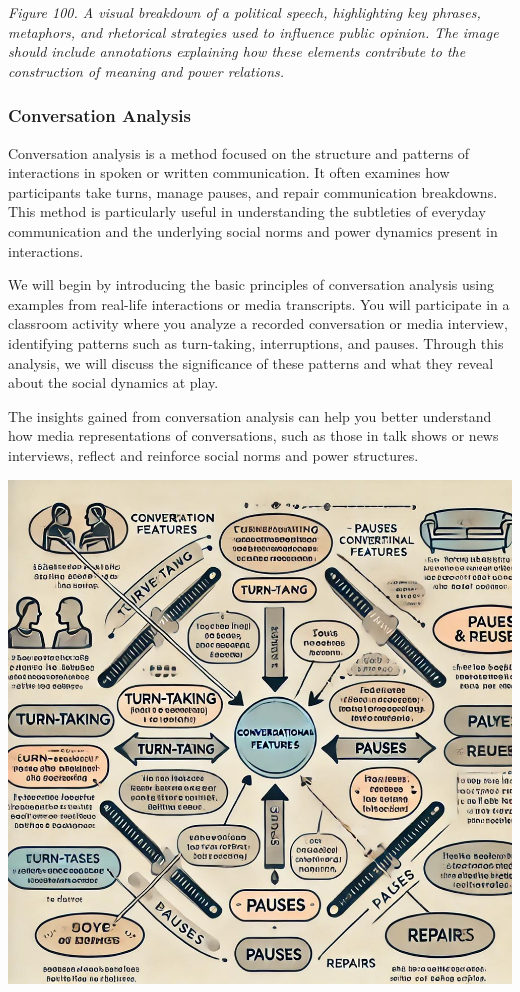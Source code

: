 \documentclass[
]{book}
\begin{document}
\emph{Figure 100. A visual breakdown of a political speech, highlighting key phrases, metaphors, and rhetorical strategies used to influence public opinion. The image should include annotations explaining how these elements contribute to the construction of meaning and power relations.}

\subsubsection{Conversation Analysis}\label{conversation-analysis}

Conversation analysis is a method focused on the structure and patterns of interactions in spoken or written communication. It often examines how participants take turns, manage pauses, and repair communication breakdowns. This method is particularly useful in understanding the subtleties of everyday communication and the underlying social norms and power dynamics present in interactions.

We will begin by introducing the basic principles of conversation analysis using examples from real-life interactions or media transcripts. You will participate in a classroom activity where you analyze a recorded conversation or media interview, identifying patterns such as turn-taking, interruptions, and pauses. Through this analysis, we will discuss the significance of these patterns and what they reveal about the social dynamics at play.

The insights gained from conversation analysis can help you better understand how media representations of conversations, such as those in talk shows or news interviews, reflect and reinforce social norms and power structures.

\includegraphics[width=1\textwidth,height=\textheight]{images/fig101.jpg}
\end{document}
